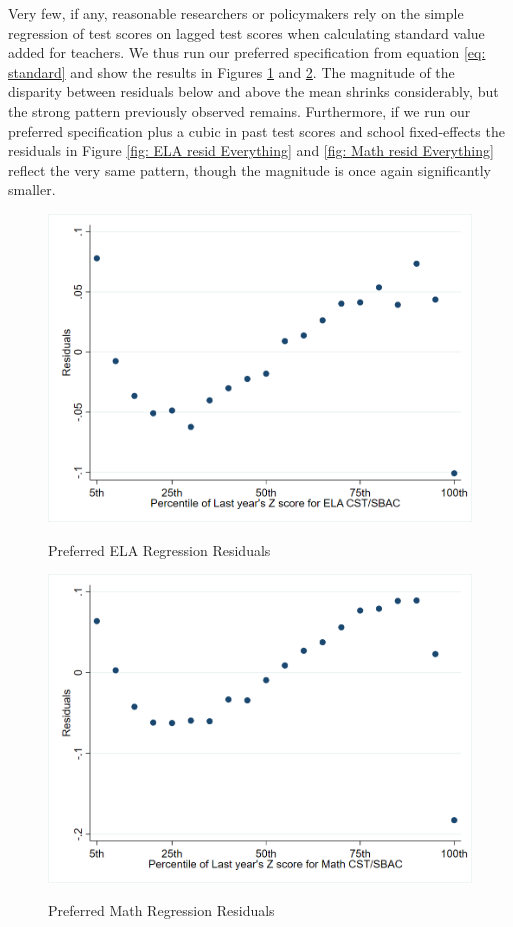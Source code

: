 \documentclass[letterpaper,12pt]{article}
\begin{document}
Very few, if any, reasonable researchers or policymakers rely on the simple regression of test scores on lagged test scores when calculating standard value added for teachers. We thus run our preferred specification from equation \ref{eq: standard} and show the results in Figures \ref{fig: ELA resid Preferred} and \ref{fig: Math resid Preferred}. The magnitude of the disparity between residuals below and above the mean shrinks considerably, but the strong pattern previously observed remains. Furthermore, if we run our preferred specification plus a cubic in past test scores and school fixed-effects the residuals in Figure \ref{fig: ELA resid Everything} and \ref{fig: Math resid Everything} reflect the very same pattern, though the magnitude is once again significantly smaller.

\begin{figure}[ht]
    \centering
    \caption{Preferred ELA Regression Residuals}
    \includegraphics[width=\textwidth]{figures/ELA_Resid_Preferred.png}
    \label{fig: ELA resid Preferred}
\end{figure}

\begin{figure}[ht]
    \centering
    \caption{Preferred Math Regression Residuals}
    \includegraphics[width=\textwidth]{figures/Math_Resid_Preferred.png}
    \label{fig: Math resid Preferred}
\end{figure}
\end{document}
